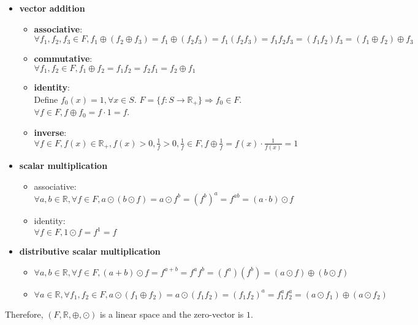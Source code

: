 \documentclass[fleqn, 10.5pt, a4paper]{article}
\newcommand\R{{\mathbb R}}
\theoremstyle{definition}
\numberwithin{equation}{section}
\begin{document}
\clearpage

\begin{itemize}
	\item \textbf{vector addition}
	\begin{itemize}
		\item \textbf{associative}: \\
		$\forall f_1, f_2, f_3 \in F, f_1 \oplus (f_2 \oplus f_3) = f_1 \oplus (f_2 f_3) = f_1 (f_2 f_3) = f_1 f_2 f_3 = (f_1 f_2) f_3 = (f_1 \oplus f_2 ) \oplus f_3$
		\item \textbf{commutative}: \\
		$\forall f_1, f_2 \in F, f_1 \oplus f_2 = f_1 f_2 = f_2 f_1 = f_2 \oplus f_1$
		\item \textbf{identity}: \\
		Define $f_0(x) = 1, \forall x \in S$. $F = \{f: S\rightarrow \R_+ \} \Rightarrow f_0 \in F$. \\
		$\forall f \in F, f \oplus f_0 = f \cdot 1 = f$.
		\item \textbf{inverse}: \\
		$\forall f \in F, f(x) \in \R_+, f(x) > 0, \frac{1}{f} > 0, \frac{1}{f} \in F, f \oplus \frac{1}{f} = f(x) \cdot \frac{1}{f(x)} = 1$
	\end{itemize}
	\item \bf{scalar multiplication}
	\begin{itemize}
		\item associative: \\
		$\forall a, b \in \R, \forall f \in F, a \odot (b \odot f) = a \odot f^b = (f^b)^a = f^{ab} = (a \cdot b) \odot f$
		\item identity: \\
		$\forall f \in F, 1 \odot f = f^1 = f$
	\end{itemize}
	\item \bf{distributive scalar multiplication}
	\begin{itemize}
		\item $\forall a, b \in \R, \forall f \in F, (a + b) \odot f = f^{a+b} = f^a f^b = (f^a) (f^b) = (a \odot f) \oplus (b \odot f)$
		\item $\forall a \in \R, \forall f_1, f_2 \in F, a \odot (f_1 \oplus f_2) = a \odot (f_1 f_2) = \left(f_1 f_2\right)^a = f_1^a f_2^a = (a \odot f_1) \oplus (a \odot f_2)$
	\end{itemize}
\end{itemize}
Therefore, $(F, \R, \oplus,\odot)$ is a linear space and the zero-vector is $1$. \\
\end{document}
